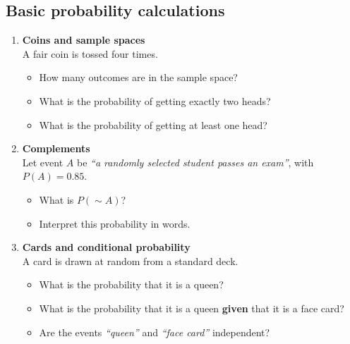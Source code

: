 \documentclass[
  letterpaper,
  DIV=11,
  numbers=noendperiod]{scrreprt}
\providecommand{\tightlist}{%
  \setlength{\itemsep}{0pt}\setlength{\parskip}{0pt}}
\begin{document}
\subsection{Basic probability
calculations}\label{basic-probability-calculations}

\begin{enumerate}
\def\labelenumi{\arabic{enumi}.}
\setcounter{enumi}{6}
\tightlist
\item
  \textbf{Coins and sample spaces}\\
  A fair coin is tossed four times.

  \begin{itemize}
  \tightlist
  \item
    How many outcomes are in the sample space?\\
  \item
    What is the probability of getting exactly two heads?\\
  \item
    What is the probability of getting at least one head?
  \end{itemize}
\item
  \textbf{Complements}\\
  Let event \(A\) be \emph{``a randomly selected student passes an
  exam''}, with \(P(A)=0.85\).

  \begin{itemize}
  \tightlist
  \item
    What is \(P(\sim A)\)?\\
  \item
    Interpret this probability in words.
  \end{itemize}
\item
  \textbf{Cards and conditional probability}\\
  A card is drawn at random from a standard deck.

  \begin{itemize}
  \tightlist
  \item
    What is the probability that it is a queen?\\
  \item
    What is the probability that it is a queen \textbf{given} that it is
    a face card?\\
  \item
    Are the events \emph{``queen''} and \emph{``face card''}
    independent?
  \end{itemize}
\end{enumerate}
\end{document}
